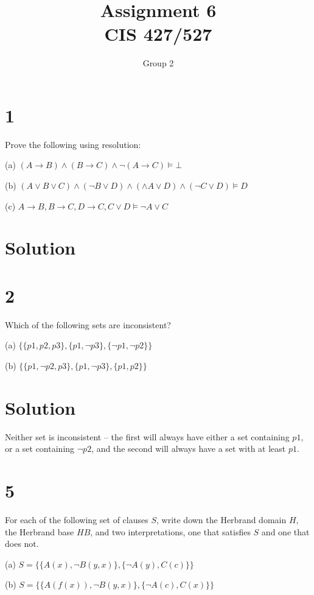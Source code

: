 \documentclass[10pt]{article}
\begin{document}
\title{Assignment \raisebox{.22ex}{\large\#}6 \\
	CIS 427/527}
\author{Group 2}

\maketitle

\section*{1}
Prove the following using resolution:

\begin{description*}
\item[(a)] $(A\to B)\land (B\to C)\land \lnot(A\to C)\models \bot$
\item[(b)] $(A\lor B\lor C)\land (\lnot B\lor D)\land (\land A\lor D)\land (\lnot C \lor D) \models D$
\item[(c)] $A\to B, B\to C, D\to C, C\lor D \models \lnot A \lor C$
\end{description*}

\section*{Solution}

\section*{2}
Which of the following sets are inconsistent?
\begin{description*}
\item[(a)] $\{ \{ p1, p2, p3\}, \{ p1, \lnot p3\}, \{ \lnot p1, \lnot p2 \} \}$
\item[(b)] $\{ \{ p1, \lnot p2, p3\}, \{ p1, \lnot p3 \}, \{ p1, p2 \} \}$
\end{description*}

\section*{Solution}
Neither set is inconsistent -- the first will always have either a set containing $p1$, or a set containing $\lnot p2$, and the second will always have a set with at least $p1$.

\section*{5}
For each of the following set of clauses $S$, write down the Herbrand domain $H$, the Herbrand base $HB$, and two interpretations, one that satisfies $S$ and one that does not.
\begin{description*}
\item[(a)] $S = \{ \{ A(x), \lnot B(y,x) \}, \{ \lnot A(y), C(c) \} \}$
\item[(b)] $S = \{ \{ A(f(x)), \lnot B(y,x)\}, \{ \lnot A(c),C(x) \} \}$
\end{description*}
\end{document}
